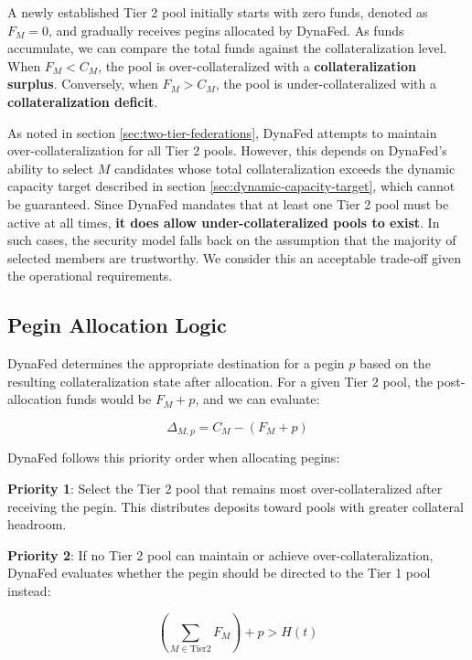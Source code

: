A newly established Tier 2 pool initially starts with zero funds, denoted as $F_M = 0$, and gradually receives pegins allocated by DynaFed. As funds accumulate, we can compare the total funds against the collateralization level. When $F_M < C_M$, the pool is over-collateralized with a \textbf{collateralization surplus}. Conversely, when $F_M > C_M$, the pool is under-collateralized with a \textbf{collateralization deficit}.

As noted in section \ref{sec:two-tier-federations}, DynaFed attempts to maintain over-collateralization for all Tier 2 pools. However, this depends on DynaFed's ability to select $M$ candidates whose total collateralization exceeds the dynamic capacity target described in section \ref{sec:dynamic-capacity-target}, which cannot be guaranteed. Since DynaFed mandates that at least one Tier 2 pool must be active at all times, \textbf{it does allow under-collateralized pools to exist}. In such cases, the security model falls back on the assumption that the majority of selected members are trustworthy. We consider this an acceptable trade-off given the operational requirements.

\subsection{Pegin Allocation Logic}
\label{sec:pegin-allocation-logic}

DynaFed determines the appropriate destination for a pegin $p$ based on the resulting collateralization state after allocation. For a given Tier 2 pool, the post-allocation funds would be $F_M + p$, and we can evaluate:

\begin{equation}
    \Delta_{M,p} = C_M - (F_M + p)
\end{equation}

DynaFed follows this priority order when allocating pegins:

\textbf{Priority 1}: Select the Tier 2 pool that remains most over-collateralized after receiving the pegin. This distributes deposits toward pools with greater collateral headroom.

\textbf{Priority 2}: If no Tier 2 pool can maintain or achieve over-collateralization, DynaFed evaluates whether the pegin should be directed to the Tier 1 pool instead:

\begin{equation}
    \left(\sum_{M \in \text{Tier2}} F_M\right) + p > H(t)
\end{equation}

